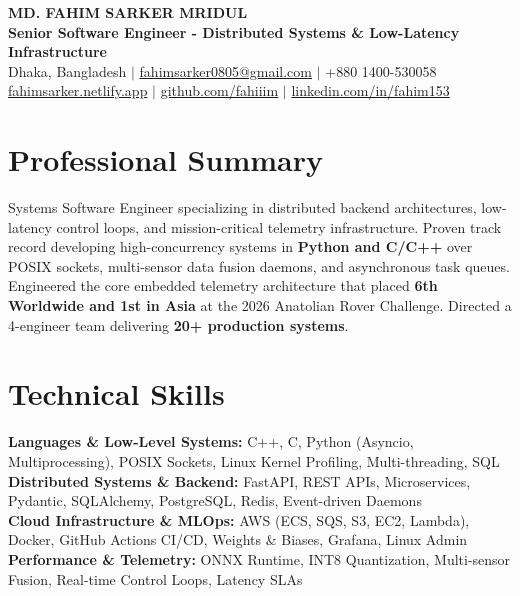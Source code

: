 \documentclass[9.5pt,a4paper]{article}
\begin{document}
{\centering
    {\Large \textbf{MD. FAHIM SARKER MRIDUL}}\\[1pt]
    \textbf{Senior Software Engineer - Distributed Systems \& Low-Latency Infrastructure}\\[1pt]
    Dhaka, Bangladesh \;$\vert$\; \href{mailto:fahimsarker0805@gmail.com}{fahimsarker0805@gmail.com} \;$\vert$\; +880 1400-530058\\[1pt]
    \href{https://fahimsarker.netlify.app}{fahimsarker.netlify.app} \;$\vert$\; \href{https://github.com/fahiiim}{github.com/fahiiim} \;$\vert$\; \href{https://linkedin.com/in/fahim153}{linkedin.com/in/fahim153}\par
}

\vspace{-4.5pt}
\section*{Professional Summary}
Systems Software Engineer specializing in distributed backend architectures, low-latency control loops, and mission-critical telemetry infrastructure. Proven track record developing high-concurrency systems in \textbf{Python and C/C++} over POSIX sockets, multi-sensor data fusion daemons, and asynchronous task queues. Engineered the core embedded telemetry architecture that placed \textbf{6th Worldwide and 1st in Asia} at the 2026 Anatolian Rover Challenge. Directed a 4-engineer team delivering \textbf{20+ production systems}.

\section*{Technical Skills}
\noindent
\textbf{Languages \& Low-Level Systems:} C++, C, Python (Asyncio, Multiprocessing), POSIX Sockets, Linux Kernel Profiling, Multi-threading, SQL\\
\textbf{Distributed Systems \& Backend:} FastAPI, REST APIs, Microservices, Pydantic, SQLAlchemy, PostgreSQL, Redis, Event-driven Daemons\\
\textbf{Cloud Infrastructure \& MLOps:} AWS (ECS, SQS, S3, EC2, Lambda), Docker, GitHub Actions CI/CD, Weights \& Biases, Grafana, Linux Admin\\
\textbf{Performance \& Telemetry:} ONNX Runtime, INT8 Quantization, Multi-sensor Fusion, Real-time Control Loops, Latency SLAs
\end{document}
